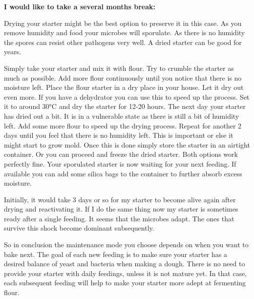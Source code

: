 \textbf{I would like to take a several months break:}

Drying your starter might be the best option to preserve it in this case. As
you remove humidity and food your microbes will sporulate. As there is no
humidity the spores can resist other pathogens very well. A dried starter can
be good for years.

Simply take your starter and mix it with flour. Try to crumble the starter as
much as possible. Add more flour continuously until you notice that there is no
moisture left. Place the flour starter in a dry place in your house. Let it
dry out even more. If you have a dehydrator you can use this to speed up the
process. Set it to around 30°C and dry the starter for 12-20 hours. The next
day your starter has dried out a bit. It is in a vulnerable state as there is still a bit
of humidity left. Add some more flour to speed up the drying process. Repeat
for another 2 days until you feel that there is no humidity left. This is
important or else it might start to grow mold. Once this is done simply store the
starter in an airtight container. Or you can proceed and freeze
the dried starter. Both options work perfectly fine. Your sporulated starter
is now waiting for your next feeding. If available you can add some silica
bags to the container to further absorb excess moisture.

Initially, it would take 3 days or so for my starter to become alive again
after drying and reactivating it. If I do the same thing now my starter is
sometimes ready after a single feeding. It seems that the microbes adapt. The ones
that survive this shock become dominant subsequently.

So in conclusion the maintenance mode you choose depends on when you want to bake next.
The goal of each new feeding is to make sure your starter
has a desired balance of yeast and bacteria when making a dough. There is no need to provide your
starter with daily feedings, unless it is not mature yet. In that case, each
subsequent feeding will help to make your starter more adept at fermenting
flour.
